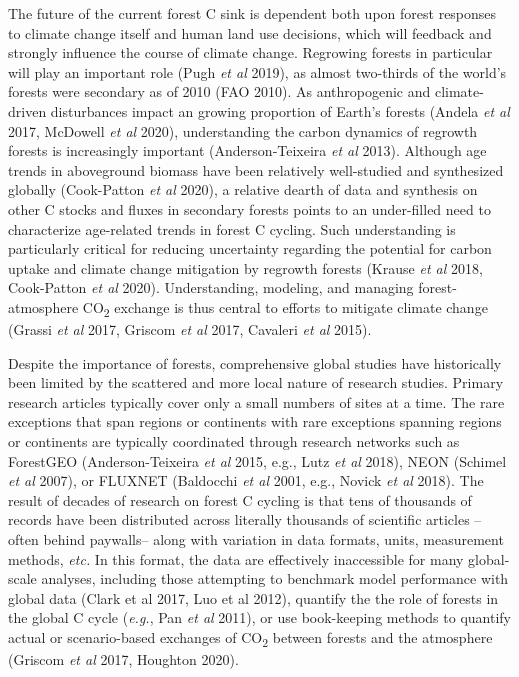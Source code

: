 \documentclass[
]{article}
\begin{document}
The future of the current forest C sink is dependent both upon forest
responses to climate change itself and human land use decisions, which
will feedback and strongly influence the course of climate change.
Regrowing forests in particular will play an important role (Pugh
\emph{et al} 2019), as almost two-thirds of the world's forests were
secondary as of 2010 (FAO 2010). As anthropogenic and climate-driven
disturbances impact an growing proportion of Earth's forests (Andela
\emph{et al} 2017, McDowell \emph{et al} 2020), understanding the carbon
dynamics of regrowth forests is increasingly important
(Anderson‐Teixeira \emph{et al} 2013). Although age trends in
aboveground biomass have been relatively well-studied and synthesized
globally (Cook-Patton \emph{et al} 2020), a relative dearth of data and
synthesis on other C stocks and fluxes in secondary forests points to an
under-filled need to characterize age-related trends in forest C
cycling. Such understanding is particularly critical for reducing
uncertainty regarding the potential for carbon uptake and climate change
mitigation by regrowth forests (Krause \emph{et al} 2018, Cook-Patton
\emph{et al} 2020). Understanding, modeling, and managing
forest-atmosphere CO\textsubscript{2} exchange is thus central to
efforts to mitigate climate change (Grassi \emph{et al} 2017, Griscom
\emph{et al} 2017, Cavaleri \emph{et al} 2015).

Despite the importance of forests, comprehensive global studies have
historically been limited by the scattered and more local nature of
research studies. Primary research articles typically cover only a small
numbers of sites at a time. The rare exceptions that span regions or
continents with rare exceptions spanning regions or continents are
typically coordinated through research networks such as ForestGEO
(Anderson-Teixeira \emph{et al} 2015, e.g., Lutz \emph{et al} 2018),
NEON (Schimel \emph{et al} 2007), or FLUXNET (Baldocchi \emph{et al}
2001, e.g., Novick \emph{et al} 2018). The result of decades of research
on forest C cycling is that tens of thousands of records have been
distributed across literally thousands of scientific articles --often
behind paywalls-- along with variation in data formats, units,
measurement methods, \emph{etc.} In this format, the data are
effectively inaccessible for many global-scale analyses, including those
attempting to benchmark model performance with global data (Clark et al
2017, Luo et al 2012), quantify the the role of forests in the global C
cycle (\emph{e.g.}, Pan \emph{et al} 2011), or use book-keeping methods
to quantify actual or scenario-based exchanges of CO\textsubscript{2}
between forests and the atmosphere (Griscom \emph{et al} 2017, Houghton
2020).
\end{document}
